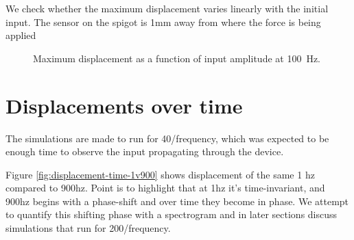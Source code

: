 We check whether the maximum displacement varies linearly with the initial input. The sensor on the spigot is 1mm away from where the force is being applied  
\begin{figure}[h] \centering
\caption{Maximum displacement as a function of input amplitude at \SI{100}{Hz}.}
\label{fig:}
\end{figure}

\section{Displacements over time}
The simulations are made to run for 40/frequency, which was expected to be enough time to observe the input propagating through the device.

Figure \ref{fig:displacement-time-1v900} shows displacement of the same 1 hz compared to 900hz. Point is to highlight that at 1hz it's time-invariant, and 900hz begins with a phase-shift and over time they become in phase.
We attempt to quantify this shifting phase with a spectrogram and in later sections discuss simulations that run for 200/frequency.
    
